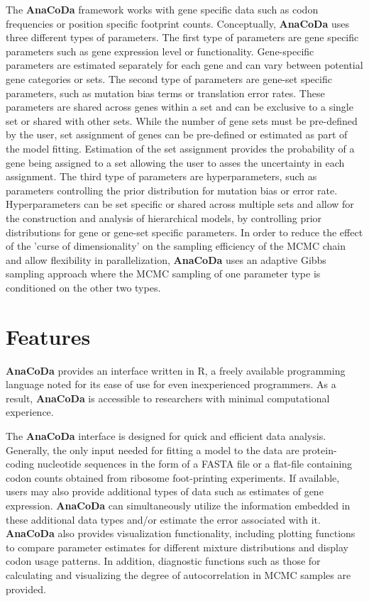 \documentclass{bioinfo}
\newcommand{\package}{\textbf{AnaCoDa }} %
\begin{document}
The \package framework works with gene specific data such as codon frequencies or position specific footprint counts.
Conceptually, \package uses three different types of parameters.
The first type of parameters are gene specific parameters such as gene expression level or functionality.
Gene-specific parameters are estimated separately for each gene and can vary between potential gene categories or sets.
The second type of parameters are gene-set specific parameters, such as mutation bias terms or translation error rates.
These parameters are shared across genes within a set and can be exclusive to a single set or shared with other sets.
While the number of gene sets must be pre-defined by the user, set assignment of genes can be pre-defined or estimated as part of the model fitting.
Estimation of the set assignment provides the probability of a gene being assigned to a set allowing the user to asses the uncertainty in each assignment.
The third type of parameters are hyperparameters, such as parameters controlling the prior distribution for mutation bias or error rate.
Hyperparameters can be set specific or shared across multiple sets and allow for the construction and analysis of hierarchical models, by controlling prior distributions for gene or gene-set specific parameters.
In order to reduce the effect of the 'curse of dimensionality' on the sampling efficiency of the MCMC chain and allow flexibility in parallelization, \package uses an adaptive Gibbs sampling approach where the MCMC sampling of one parameter type is conditioned on the other two types.

\section*{Features}
\package provides an interface written in R, a freely available programming language noted for its ease of use for even inexperienced programmers. 
As a result, \package is accessible to researchers with minimal computational experience. 

The \package interface is designed for quick and efficient data analysis.
Generally, the only input needed for fitting a model to the data are protein-coding nucleotide sequences in the form of a FASTA file or a flat-file containing codon counts obtained from ribosome foot-printing experiments. 
If available, users may also provide additional types of data such as estimates of gene expression.
\package can simultaneously utilize the information embedded in these additional data types and/or estimate the error associated with it.
\package also provides visualization functionality, including plotting functions to compare parameter estimates for different mixture distributions and display codon usage patterns. In addition, diagnostic functions such as those for calculating and visualizing the degree of autocorrelation in MCMC samples are provided.
\end{document}
